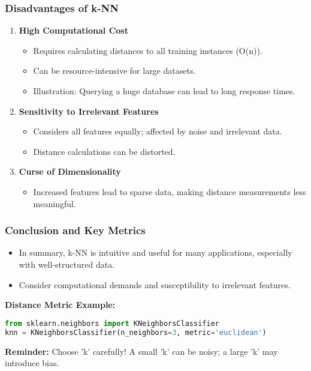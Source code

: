 \documentclass[aspectratio=169]{beamer}
\begin{document}
\begin{frame}[fragile]
    \frametitle{Disadvantages of k-NN}
    \begin{enumerate}
        \item \textbf{High Computational Cost}
        \begin{itemize}
            \item Requires calculating distances to all training instances (O(n)).
            \item Can be resource-intensive for large datasets.
            \item Illustration: Querying a huge database can lead to long response times.
        \end{itemize}
        
        \item \textbf{Sensitivity to Irrelevant Features}
        \begin{itemize}
            \item Considers all features equally; affected by noise and irrelevant data.
            \item Distance calculations can be distorted.
        \end{itemize}
        
        \item \textbf{Curse of Dimensionality}
        \begin{itemize}
            \item Increased features lead to sparse data, making distance measurements less meaningful.
        \end{itemize}
    \end{enumerate}
\end{frame}

\begin{frame}[fragile]
    \frametitle{Conclusion and Key Metrics}
    \begin{itemize}
        \item In summary, k-NN is intuitive and useful for many applications, especially with well-structured data.
        \item Consider computational demands and susceptibility to irrelevant features.
    \end{itemize}

    \textbf{Distance Metric Example:}
    \begin{lstlisting}[language=Python]
from sklearn.neighbors import KNeighborsClassifier
knn = KNeighborsClassifier(n_neighbors=3, metric='euclidean')
    \end{lstlisting}

    \textbf{Reminder:} Choose 'k' carefully! A small 'k' can be noisy; a large 'k' may introduce bias.
\end{frame}
\end{document}

